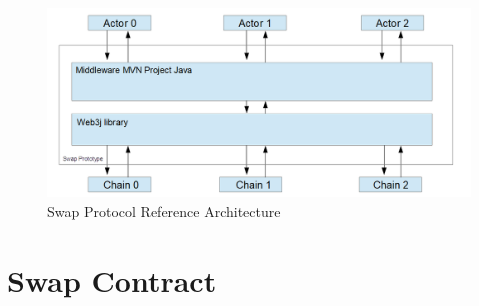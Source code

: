 
\begin{figure}[h]
	\begin{center}
		\includegraphics[width=0.6\paperwidth]{reference_architecture}
		\caption{Swap Protocol Reference Architecture}
		\label{fig:reference_architecture}
	\end{center}
\end{figure}
\clearpage

%
%
\section{Swap Contract}
\label{sec:chapter04:smartcontracts}

